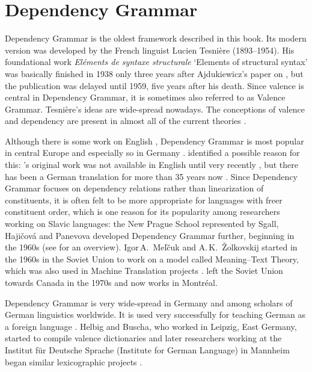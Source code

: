 \chapter{Dependency Grammar}
\label{Kapitel-DG}


Dependency Grammar is the oldest framework described in this book. Its modern version was developed by the
French linguist Lucien Tesnière (1893--1954). His foundational work \emph{Eléments de syntaxe
  structurale} `Elements of structural syntax' was basically finished in 1938 only three years after
Ajdukiewicz's paper on \cg \citeyearpar{Ajdukiewicz35a-u}, but the publication
was delayed until 1959, five years after his death\nocite{Tesniere59a-u}. Since valence is central
in Dependency Grammar, it is sometimes also referred to as Valence Grammar. 
Tesnière's ideas are wide-spread nowadays. The conceptions of valence and dependency are present in
almost all of the current theories \citep[--263, 284]{AF2010a}.

Although there is some work on English \citep{Anderson71a-u,Hudson84a-u}, Dependency Grammar is most popular in central Europe and especially so in Germany \citep[--57]{Engel96a}. \citet[]{AF2010a} identified a possible reason for this: \tes's
original work was not available in English until very recently \citep{Tesniere2015a-u}, but there has
been a German translation for more than 35 years now \citep{Tesniere80a-u}. Since Dependency Grammar focuses on dependency relations rather than
linearization of constituents, it is often felt to be more appropriate for languages with freer
constituent order, which is one reason for its popularity among researchers working on Slavic
languages: the New Prague School represented by Sgall, Hajičová and Panevova developed Dependency Grammar further,
beginning in the 1960s (see \citealp{HS2003a-u} for an overview).  Igor\,A.\ Meľčuk and
A.\,K.\ Žolkovskij started in the 1960s in the Soviet Union to work on a model called Meaning–Text Theory, which was also used in Machine
Translation projects \citep{Melcuk64a-u,Melcuk81a,Melcuk88a-u,Kahane2003a-u}. \mel left the
Soviet Union towards Canada in the 1970s and now works in Montréal. 

Dependency Grammar is very wide-spread in Germany and among scholars of German linguistics
worldwide. It is used very successfully for teaching German as a foreign language
\citep{HB69a-u,HB98a}. Helbig and Buscha, who worked in Leipzig, East Germany, started to
compile valence dictionaries \citep{HS69a-u} and later researchers working at the Institut für
Deutsche Sprache (Institute for German Language) in Mannheim began similar lexicographic projects \citep{SKSR2004a-u}. 

